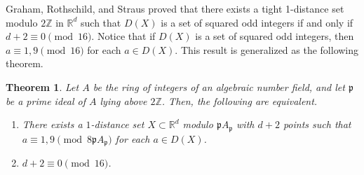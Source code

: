 \documentclass[a4paper, 11pt]{article}
\newcommand{\Z}{\mathbb{Z}}
\newcommand{\p}{\mathfrak{p}}
\newtheorem{theorem}{Theorem}[section]
\theoremstyle{definition}
\begin{document}
 Graham, Rothschild, and Straus \cite{GRS74} proved that 
there exists a tight 1-distance set modulo $2 \mathbb{Z}$ in $\mathbb{R}^d$ such that $D(X)$ is a set of squared odd integers if and only if $d+2\equiv 0 \pmod{16}$. 
Notice that if $D(X)$ is a set of squared odd integers, then
$a\equiv 1,9 \pmod{16}$ for each $a \in D(X)$.
This result is generalized as the following theorem. 
\begin{theorem}
    Let $A$ be the ring of integers of an algebraic number field, and let $\p$ be a prime ideal of $A$ lying above $2\Z$. 
Then, the following are equivalent. 
\begin{enumerate}
    \item There exists a $1$-distance set $X \subset \mathbb{R}^d$ modulo $\p A_\p$ with $d+2$ points such that $a\equiv 1, 9 \pmod{8 \p A_\p}$ for each $a \in D(X)$.
    \item $d+2\equiv 0 \pmod{16}$. 
\end{enumerate}
\end{theorem}
\end{document}

